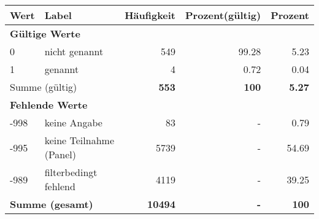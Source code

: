      \begin{longtable}{lXrrr}
     \toprule
     \textbf{Wert} & \textbf{Label} & \textbf{Häufigkeit} & \textbf{Prozent(gültig)} & \textbf{Prozent} \\
     \endhead
     \midrule
     \multicolumn{5}{l}{\textbf{Gültige Werte}}\\

     0 &
     \multicolumn{1}{X}{ nicht genannt   } &


       \num{549} &
       \num[round-mode=places,round-precision=2]{99,28} &
         \num[round-mode=places,round-precision=2]{5,23} \\

     1 &
     \multicolumn{1}{X}{ genannt   } &


       \num{4} &
       \num[round-mode=places,round-precision=2]{0,72} &
         \num[round-mode=places,round-precision=2]{0,04} \\
     \midrule
     \multicolumn{2}{l}{Summe (gültig)} &
       \textbf{\num{553}} &
     \textbf{100} &
       \textbf{\num[round-mode=places,round-precision=2]{5,27}} \\
     \multicolumn{5}{l}{\textbf{Fehlende Werte}}\\
       -998 &
       keine Angabe &
         \num{83} &
        - &
         \num[round-mode=places,round-precision=2]{0,79} \\
       -995 &
       keine Teilnahme (Panel) &
         \num{5739} &
        - &
         \num[round-mode=places,round-precision=2]{54,69} \\
       -989 &
       filterbedingt fehlend &
         \num{4119} &
        - &
         \num[round-mode=places,round-precision=2]{39,25} \\
     \midrule
     \multicolumn{2}{l}{\textbf{Summe (gesamt)}} &
          \textbf{\num{10494}} &
        \textbf{-} &
        \textbf{100} \\
     \bottomrule
     \end{longtable}
     
